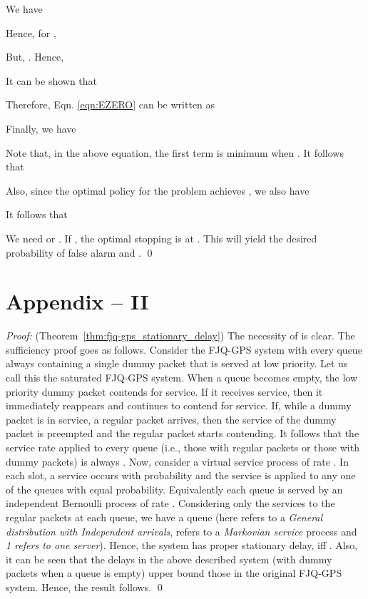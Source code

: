 \documentclass[acmtosn]{acmtrans2m}
\begin{document}
We have


Hence, for ,

But, . Hence,


It can be shown that 



Therefore, Eqn. \ref{eqn:EZERO} can be written as


Finally, we have 


Note that, in the above equation, the first term
 is minimum when .
It follows that

Also, since the optimal policy for the problem
 achieves  , we also have 

It follows that


We need  or .
If , the optimal stopping is at . 
This will yield the desired probability of false alarm and 
.
\qed

\section*{Appendix -- II}
\emph{Proof:} (Theorem~\ref{thm:fjq-gps_stationary_delay})
   The necessity of  is clear. The sufficiency
   proof goes as follows. Consider the FJQ-GPS system with every queue
   always containing a single dummy packet that is served at low
   priority. Let us call this the saturated
   FJQ-GPS system.  When a queue becomes empty, the low priority dummy
   packet contends for service. If it receives service, then it
   immediately reappears and continues to contend for service.  If,
   while a dummy packet is in service, a regular packet arrives, then
   the service of the dummy packet is preempted and the regular packet
   starts contending. It follows that the service rate applied to
   every queue (i.e., those with regular packets or those with dummy
   packets) is always . Now, consider a virtual service
   process of rate . In each slot, a service occurs with
   probability  and the service is applied to any one of the
   queues with equal probability.  Equivalently each queue is served
   by an independent Bernoulli process of rate .
   Considering only the services to the regular packets at each queue,
   we have a  queue (here  refers to a 
   {\em General distribution with Independent arrivals},  refers to 
   a {\em Markovian service} process and {\em 1 refers to one server}). 
   Hence, the system has proper stationary
   delay, iff . Also, it can be seen that the
   delays in the above described system (with dummy packets when a queue is empty) 
   upper bound those in the original
   FJQ-GPS system.  Hence, the result follows.
\qed
\end{document}
